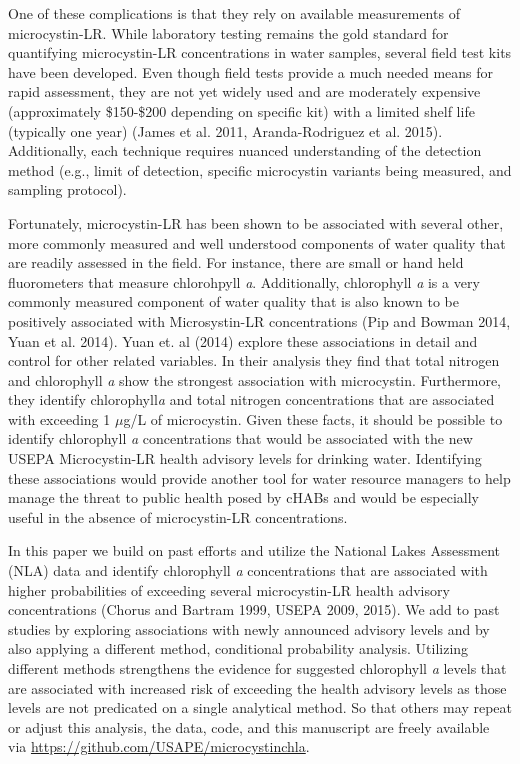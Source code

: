 \documentclass[11pt,]{article}
\begin{document}
One of these complications is that they rely on available measurements
of microcystin-LR. While laboratory testing remains the gold standard
for quantifying microcystin-LR concentrations in water samples, several
field test kits have been developed. Even though field tests provide a
much needed means for rapid assessment, they are not yet widely used and
are moderately expensive (approximately \$150-\$200 depending on
specific kit) with a limited shelf life (typically one year) (James et
al. 2011, Aranda-Rodriguez et al. 2015). Additionally, each technique
requires nuanced understanding of the detection method (e.g., limit of
detection, specific microcystin variants being measured, and sampling
protocol).

Fortunately, microcystin-LR has been shown to be associated with several
other, more commonly measured and well understood components of water
quality that are readily assessed in the field. For instance, there are
small or hand held fluorometers that measure chlorohpyll \emph{a}.
Additionally, chlorophyll \emph{a} is a very commonly measured component
of water quality that is also known to be positively associated with
Microsystin-LR concentrations (Pip and Bowman 2014, Yuan et al. 2014).
Yuan et. al (2014) explore these associations in detail and control for
other related variables. In their analysis they find that total nitrogen
and chlorophyll \emph{a} show the strongest association with
microcystin. Furthermore, they identify chlorophyll\emph{a} and total
nitrogen concentrations that are associated with exceeding 1 \(\mu\)g/L
of microcystin. Given these facts, it should be possible to identify
chlorophyll \emph{a} concentrations that would be associated with the
new USEPA Microcystin-LR health advisory levels for drinking water.
Identifying these associations would provide another tool for water
resource managers to help manage the threat to public health posed by
cHABs and would be especially useful in the absence of microcystin-LR
concentrations.

In this paper we build on past efforts and utilize the National Lakes
Assessment (NLA) data and identify chlorophyll \emph{a} concentrations
that are associated with higher probabilities of exceeding several
microcystin-LR health advisory concentrations (Chorus and Bartram 1999,
USEPA 2009, 2015). We add to past studies by exploring associations with
newly announced advisory levels and by also applying a different method,
conditional probability analysis. Utilizing different methods
strengthens the evidence for suggested chlorophyll \emph{a} levels that
are associated with increased risk of exceeding the health advisory
levels as those levels are not predicated on a single analytical method.
So that others may repeat or adjust this analysis, the data, code, and
this manuscript are freely available via
\href{https://github.com/USAPE/microcystinchla}{\url{https://github.com/USAPE/microcystinchla}}.
\end{document}
